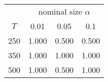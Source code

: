 % 
\begin{tabular}{cccc}
  \hline
  & \multicolumn{3}{c}{nominal size $\alpha$} \\
 $T$ & 0.01 & 0.05 & 0.1 \\
 \hline
250 & 1.000 & 0.500 & 0.500 \\ 
  350 & 1.000 & 1.000 & 1.000 \\ 
  500 & 1.000 & 0.500 & 1.000 \\ 
   \hline
\end{tabular}
